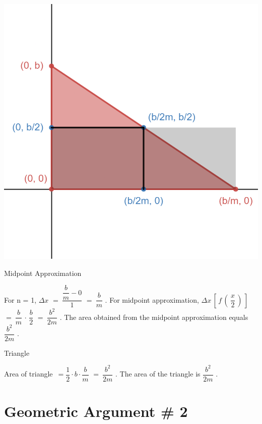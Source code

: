 \documentclass[letterpaper,12pt]{article}
\theoremstyle{definition}
\begin{document}
\includegraphics[scale=0.25]{desmos-graph.png}

\raggedright

\begin{minipage}{0.45\textwidth}
 \begin{center}
  Midpoint Approximation
 \end{center}
 For n = 1, $\Delta x$
 \vskip 16pt
 $=\ \dfrac{\dfrac{b}{m}-0}{1}$
 \vskip 16pt
 $=\ \dfrac{b}{m}$ .
 \vskip 16pt
 For midpoint approximation, $\Delta x\, [\, f\,(\, \dfrac{x}{2}\, )\, ]$
 \vskip 16pt
 $=\ \dfrac{b}{m}\, \cdot\, \dfrac{b}{2}$
 \vskip 16pt
 $=\ \dfrac{b^2}{2m}$ .
 \vskip 16pt
 The area obtained from the midpoint approximation equals $\dfrac{b^2}{2m}$ .
\end{minipage}
\hfill
\begin{minipage}{0.45\textwidth}
 \begin{center}
  \vspace{-56mm}
  Triangle
 \end{center}
 \vskip 16pt
 Area of triangle\ $=\dfrac{1}{2}\cdot b\cdot \dfrac{b}{m}$
 \vskip 16pt
 $=\ \dfrac{b^2}{2m}$ .
 \vskip 16pt
 The area of the triangle is $\dfrac{b^2}{2m}$ .
\end{minipage}

\pagebreak

\section{Geometric Argument \# 2}
\end{document}
